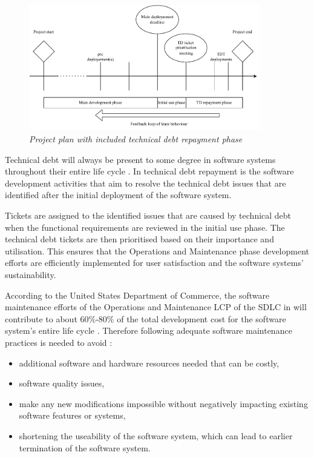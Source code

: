 \clearpage

\begin{figure}[!htb]
	\centering %
	\includegraphics[width=0.9\textwidth]{img/Chapter1/TD_repayment/TD_repayment.pdf}
	\caption[Project plan with included technical debt repayment phase]
	{\textit{Project plan with included technical debt repayment phase \cite{Wiese2021}}}\label{fig:ch1_tdRepayment}
\end{figure} 

Technical debt will always be present to some degree in software systems throughout their entire life cycle \cite{Wiese2021}. In  technical debt repayment is the software development activities that aim to resolve the technical debt issues that are identified after the initial deployment of the software system.\par Tickets are assigned to the identified issues that are caused by technical debt when the functional requirements are reviewed in the initial use phase. The technical debt tickets are then prioritised based on their importance and utilisation. This ensures that the Operations and Maintenance phase development efforts are efficiently implemented for user satisfaction and the software systems' sustainability. \par According to the United States Department of Commerce, the software maintenance efforts of the Operations and Maintenance LCP of the SDLC in  will contribute to about $60\%$-$80\%$ of the total development cost for the software system's entire life cycle \cite{Ogheneovo2014, Stark1996, Ackermann2009, Tang2010}. Therefore following adequate software maintenance practices is needed to avoid \cite{DeLeon-Sigg2020}:

\begin{itemize}
	\item additional software and hardware resources needed that can be costly,
	\item software quality issues,
	\item make any new modifications impossible without negatively impacting existing software features or systems,
	\item shortening the useability of the software system, which can lead to earlier termination of the software system.
\end{itemize}

